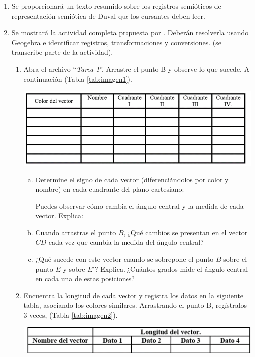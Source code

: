 \documentclass[oneside,spanish]{amsart}
\numberwithin{equation}{section}
\numberwithin{figure}{section}
\begin{document}
\begin{enumerate}[1.]
	\item Se proporcionará un texto resumido sobre los registros semióticos de representación semiótica de Duval que los cursantes deben leer.
	\item Se mostrará la actividad completa propuesta por \citet[pág. 73]{salazar-mendez} . Deberán resolverla usando Geogebra e identificar registros, transformaciones y conversiones. (se transcribe parte de la actividad).
	
	\hspace{1mm}
	
	\begin{enumerate}[1.]
	\item Abra el archivo “\textit{Tarea 1}”. Arrastre el punto B y observe lo que sucede. A continuación (Tabla \ref{tab:imagen1}).
		
	\begin{table}[h]
		\centering
		\caption{}
		\label{tab:imagen1}
		\includegraphics[width=0.8\linewidth]{Anexos-02/Imagen1.png}
	\end{table}
		
	\begin{enumerate}[a.]
		\item Determine el signo de cada vector (diferenciándolos por color y nombre) en cada cuadrante del plano cartesiano:
			
		Puedes observar cómo cambia el ángulo central y la medida de cada vector. Explica:
			
		\item Cuando arrastras el punto $B$, ¿Qué cambios se presentan en el vector $CD$ cada vez que cambia la medida del ángulo central?
			
		\item ¿Qué sucede con este vector cuando se sobrepone el punto $B$ sobre el punto $E$ y sobre $E'$? Explica. ¿Cuántos grados mide el ángulo central en cada una de estas posiciones?
		\end{enumerate}
		
	\item Encuentra la longitud de cada vector y registra los datos en la siguiente tabla, asociando los colores similares. Arrastrando el punto B, regístralos 3 veces, (Tabla \ref{tab:imagen2}).
	
	\begin{table}[h]
		\centering
		\caption{}
		\label{tab:imagen2}
		\includegraphics[width=0.8\linewidth]{Anexos-02/Imagen2.png}
	\end{table}
	\end{enumerate}
\end{enumerate}	
\end{document}
